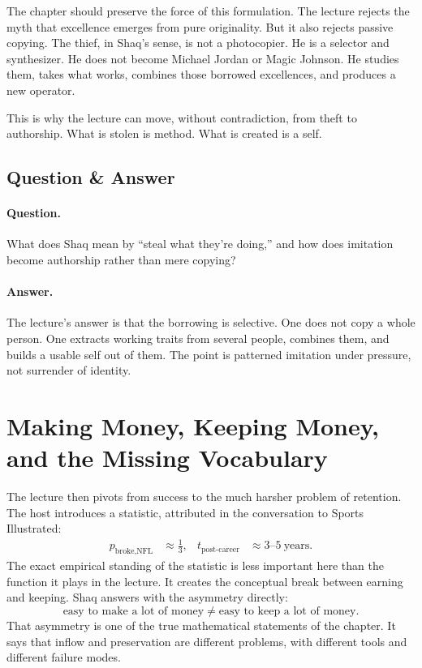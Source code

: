 The chapter should preserve the force of this formulation. The lecture rejects the myth that excellence emerges from pure originality. But it also rejects passive copying. The thief, in Shaq's sense, is not a photocopier. He is a selector and synthesizer. He does not become Michael Jordan or Magic Johnson. He studies them, takes what works, combines those borrowed excellences, and produces a new operator.

This is why the lecture can move, without contradiction, from theft to authorship. What is stolen is method. What is created is a self.

\subsection{Question \& Answer}

\paragraph{Question.} What does Shaq mean by ``steal what they're doing,'' and how does imitation become authorship rather than mere copying?

\paragraph{Answer.} The lecture's answer is that the borrowing is selective. One does not copy a whole person. One extracts working traits from several people, combines them, and builds a usable self out of them. The point is patterned imitation under pressure, not surrender of identity.

\section{Making Money, Keeping Money, and the Missing Vocabulary}

The lecture then pivots from success to the much harsher problem of retention. The host introduces a statistic, attributed in the conversation to Sports Illustrated:
\begin{align}
p_{\text{broke,NFL}} &\approx \frac{1}{3}, &
t_{\text{post-career}} &\approx 3\text{--}5\ \text{years}.
\end{align}
The exact empirical standing of the statistic is less important here than the function it plays in the lecture. It creates the conceptual break between earning and keeping. Shaq answers with the asymmetry directly:
\begin{equation}
\text{easy to make a lot of money} \neq \text{easy to keep a lot of money}.
\end{equation}
That asymmetry is one of the true mathematical statements of the chapter. It says that inflow and preservation are different problems, with different tools and different failure modes.

